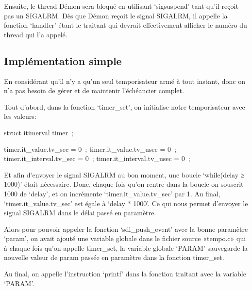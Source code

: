 \documentclass{article}
\begin{document}
Ensuite, le thread Démon sera bloqué en utilisant ‘sigsuspend’ tant qu’il reçoit pas un SIGALRM.
Dès que Démon reçoit le signal SIGALRM, il appelle la fonction ‘handler’ étant le traitant qui devrait effectivement afficher le numéro du thread qui l’a appelé.

\subsection{Implémentation simple}

En considérant qu’il n’y a qu’un seul temporisateur armé à tout instant, donc on n’a pas besoin de gérer et de maintenir l’échéancier complet. 

Tout d’abord, dans la fonction ‘timer_set’, on initialise notre temporisateur avec les valeurs:

struct itimerval timer ;

timer.it_value.tv_sec = 0 ;
timer.it_value.tv_usec = 0 ;
timer.it_interval.tv_sec = 0 ;
timer.it_interval.tv_usec = 0 ;

Et afin d’envoyer le signal SIGALRM au bon moment, une boucle ‘while(delay ≥ 1000)’ était nécessaire. Donc, chaque fois qu’on rentre dans la boucle on souscrit 1000 de ‘delay’, et on incrémente  ‘timer.it_value.tv_sec’ par 1. Au final, ‘timer.it_value.tv_sec’ est égale à ‘delay * 1000’.
Ce qui nous permet d’envoyer le signal SIGALRM dans le délai passé en paramètre.

Alors pour pouvoir appeler la fonction ‘sdl_push_event’ avec la bonne paramètre ‘param’, on avait ajouté une variable globale dans le fichier source «tempo.c» qui à chaque fois qu’on appelle timer_set, la variable globale ‘PARAM’ sauvegarde la nouvelle valeur de param passée en paramètre dans la fonction timer_set.

Au final, on appelle l’instruction ‘printf’ dans la fonction traitant avec la variable ‘PARAM’.
\end{document}
